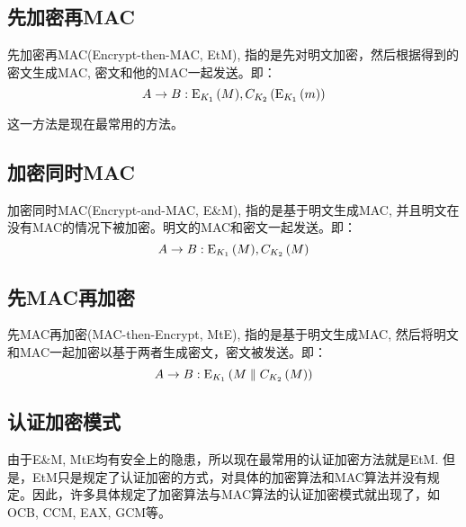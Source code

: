 \subsection{先加密再MAC}
先加密再MAC(Encrypt-then-MAC, EtM), 指的是先对明文加密，然后根据得到的密文生成MAC, 密文和他的MAC一起发送。即：
\[A\to B: {\mathrm{E}_{K_1}\left({M}\right)}, C_{K_2}\left( {{\mathrm{E}_{K_1}\left({m}\right)}}\right)\]

这一方法是现在最常用的方法。
\subsection{加密同时MAC}
加密同时MAC(Encrypt-and-MAC, E\&M), 指的是基于明文生成MAC, 并且明文在没有MAC的情况下被加密。明文的MAC和密文一起发送。即：
\[A\to B:{\mathrm{E}_{K_1}\left({M}\right)}, C_{K_2}\left( {M}\right)\]
\subsection{先MAC再加密}
先MAC再加密(MAC-then-Encrypt, MtE), 指的是基于明文生成MAC, 然后将明文和MAC一起加密以基于两者生成密文，密文被发送。即：
\[A\to B:{\mathrm{E}_{K_1}\left({M\parallel C_{K_2}\left( {M}\right)}\right)}\]
\subsection{认证加密模式}
由于E\&M, MtE均有安全上的隐患，所以现在最常用的认证加密方法就是EtM. 但是，EtM只是规定了认证加密的方式，对具体的加密算法和MAC算法并没有规定。因此，许多具体规定了加密算法与MAC算法的认证加密模式就出现了，如OCB, CCM, EAX, GCM等。